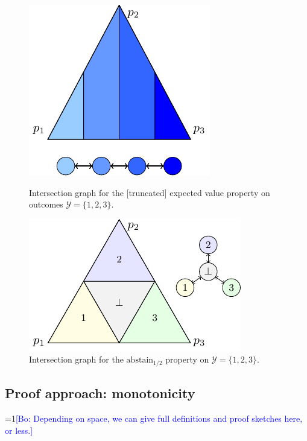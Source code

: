 \documentclass[anon]{colt2020} %
\newcommand{\Comments}{1}
\newcommand{\mynote}[2]{\ifnum\Comments=1\textcolor{#1}{#2}\fi}
\newcommand{\bo}[1]{\mynote{blue}{[Bo: #1]}}
\newcommand{\abstain}[1]{\mathrm{abstain}_{#1}}
\newcommand{\Y}{\mathcal{Y}}
\begin{document}
\begin{figure}
	\begin{minipage}{0.48\linewidth}
	\centering
	\includegraphics[width = 0.8\linewidth]{tikz/intersection-graph.pdf}
	\caption{Intersection graph for the [truncated] expected value property on outcomes $\Y = \{1,2,3\}$.}
	\label{fig:intersection-graph-ex}
	\end{minipage}
\hfill
	\begin{minipage}{0.48\linewidth}
	\centering
	\includegraphics[width = 0.9\linewidth]{tikz/abstain-alpha-half.pdf}
	\caption{Intersection graph for the $\abstain{1/2}$ property on $\Y = \{1,2,3\}$.}
	\label{fig:abstain-alpha-half}
\end{minipage}
\end{figure}


\subsection{Proof approach: monotonicity}
\bo{Depending on space, we can give full definitions and proof sketches here, or less.}
\end{document}

